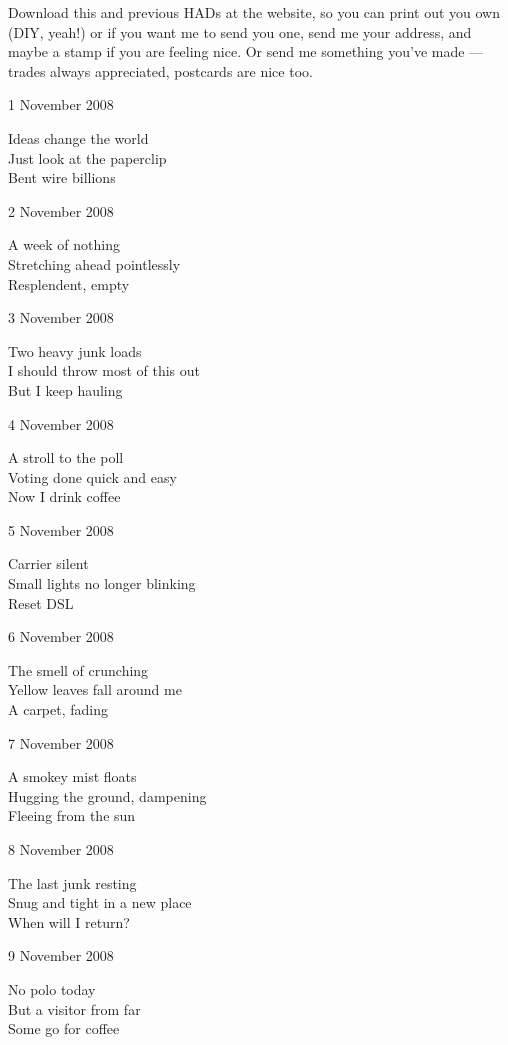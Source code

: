 \documentclass[12pt]{article}
\begin{document}
Download this and previous HADs at the website, so you can
print out you own (DIY, yeah!) or if you want me to send
you one, send me your address, and maybe a stamp if you
are feeling nice. Or send me something you've made ---
trades always appreciated, postcards are nice too.


1 November 2008

Ideas change the world \\
Just look at the paperclip \\
Bent wire billions

2 November 2008

A week of nothing \\
Stretching ahead pointlessly \\
Resplendent, empty

\newpage

3 November 2008

Two heavy junk loads \\
I should throw most of this out \\
But I keep hauling

4 November 2008

A stroll to the poll \\
Voting done quick and easy \\
Now I drink coffee

5 November 2008

Carrier silent \\
Small lights no longer blinking \\
Reset DSL

6 November 2008

The smell of crunching \\
Yellow leaves fall around me \\
A carpet, fading

7 November 2008

A smokey mist floats \\
Hugging the ground, dampening \\
Fleeing from the sun

8 November 2008

The last junk resting \\
Snug and tight in a new place \\
When will I return?

9 November 2008

No polo today \\
But a visitor from far \\
Some go for coffee
\end{document}
